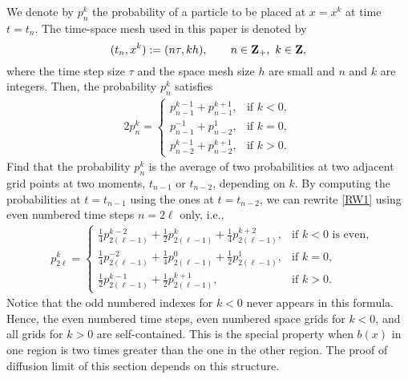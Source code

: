 \documentclass[11pt]{amsart}
\def\Z{{\bf Z}}
\begin{document}
We denote by $p_n^k$ the probability of a particle to be placed at $x=x^k$ at time $t=t_n$. The time-space mesh used in this paper is denoted by
$$
(t_n,x^k):=(n\tau,kh),\qquad n\in\Z_+,\ k\in\Z,
$$
where the time step size $\tau$ and the space mesh size $h$ are small and $n$ and $k$ are integers. Then, the probability $p_n^k$ satisfies
\begin{equation} \label{RW1}%
\begin{aligned}
    2p^k_n = \left\{\begin{array}{lr}
        p^{k-1} _{n-1} + p ^{k+1} _{n-1}, & \text{if } k<0,\\
        p^{-1} _{n-1} + p ^{1} _{n-2}, & \text{if } k=0,\\
        p^{k-1} _{n-2} + p ^{k+1} _{n-2}, & \text{if } k>0.
        \end{array}\right.
\end{aligned}
\end{equation}
Find that the probability $p^k_n$ is the average of two probabilities at two adjacent grid points at two moments, $t_{n-1}$ or $t_{n-2}$, depending on $k$. By computing the probabilities at  $t=t_{n-1}$ using the ones at $t=t_{n-2}$, we can rewrite \eqref{RW1} using even numbered time steps $n=2\ell$ only, i.e.,
\begin{equation} \label{RW2}%
\begin{aligned}
    &p^{k}_{2\ell} = \left\{\begin{array}{ll}
        \frac{1}{4}p^{k-2} _{2(\ell-1)} + \frac{1}{2}p ^{k} _{2(\ell-1)} +
        \frac{1}{4} p^{k+2}_{2(\ell-1)}, & \text{if $k<0$ is even},\\
        \frac{1}{4}p^{-2} _{2(\ell-1)} + \frac{1}{4}p^{0} _{2(\ell-1)} +
        \frac{1}{2}p ^{1} _{2(\ell-1)}, & \text{if $k=0$},\\
        \frac{1}{2}p^{k-1} _{2(\ell-1)} + \frac{1}{2}p ^{k+1} _{2(\ell-1)},
        & \text{if } k>0.
        \end{array}\right.
\end{aligned}
\end{equation}
Notice that the odd numbered indexes for $k<0$ never appears in this formula. Hence, the even numbered time steps, even numbered space grids for $k<0$, and all grids for $k>0$ are self-contained. This is the special property when $b(x)$ in one region is two times greater than the one in the other region. The proof of diffusion limit of this section depends on this structure.
\end{document}

